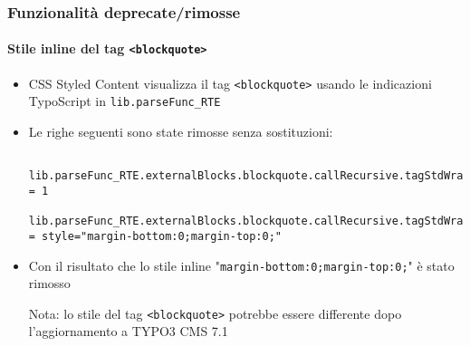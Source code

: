 
\begin{frame}[fragile]
	\frametitle{Funzionalità deprecate/rimosse}
	\framesubtitle{Stile inline del tag \texttt{<blockquote>}}

	\lstset{basicstyle=\tiny\ttfamily}

	\begin{itemize}

		\item CSS Styled Content visualizza il tag \texttt{<blockquote>} usando le indicazioni TypoScript in \texttt{lib.parseFunc\_RTE}
		\item Le righe seguenti sono state rimosse senza sostituzioni:

			\begin{lstlisting}
				lib.parseFunc_RTE.externalBlocks.blockquote.callRecursive.tagStdWrap.HTMLparser = 1
				lib.parseFunc_RTE.externalBlocks.blockquote.callRecursive.tagStdWrap.HTMLparser.tags.blockquote.overrideAttribs = style="margin-bottom:0;margin-top:0;"
			\end{lstlisting}

		\item Con il risultato che lo stile inline "\texttt{margin-bottom:0;margin-top:0;}"\newline
			è stato rimosso

			\vspace{0.2cm}

			\begingroup
				\color{red}
					Nota: lo stile del tag \texttt{<blockquote>} potrebbe essere differente dopo
						l'aggiornamento a TYPO3 CMS 7.1
			\endgroup

	\end{itemize}

\end{frame}



